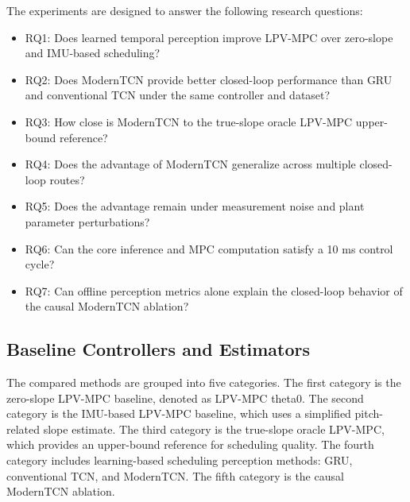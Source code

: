 \documentclass[twocolumn]{article}
\begin{document}
The experiments are designed to answer the following research questions:

\begin{itemize}

\item RQ1: Does learned temporal perception improve LPV-MPC over zero-slope and IMU-based scheduling?

\item RQ2: Does ModernTCN provide better closed-loop performance than GRU and conventional TCN under the same controller and dataset?

\item RQ3: How close is ModernTCN to the true-slope oracle LPV-MPC upper-bound reference?

\item RQ4: Does the advantage of ModernTCN generalize across multiple closed-loop routes?

\item RQ5: Does the advantage remain under measurement noise and plant parameter perturbations?

\item RQ6: Can the core inference and MPC computation satisfy a 10 ms control cycle?

\item RQ7: Can offline perception metrics alone explain the closed-loop behavior of the causal ModernTCN ablation?

\end{itemize}

\subsection{Baseline Controllers and Estimators}

The compared methods are grouped into five categories. The first category is the zero-slope LPV-MPC baseline, denoted as LPV-MPC theta0. The second category is the IMU-based LPV-MPC baseline, which uses a simplified pitch-related slope estimate. The third category is the true-slope oracle LPV-MPC, which provides an upper-bound reference for scheduling quality. The fourth category includes learning-based scheduling perception methods: GRU, conventional TCN, and ModernTCN. The fifth category is the causal ModernTCN ablation.
\end{document}
